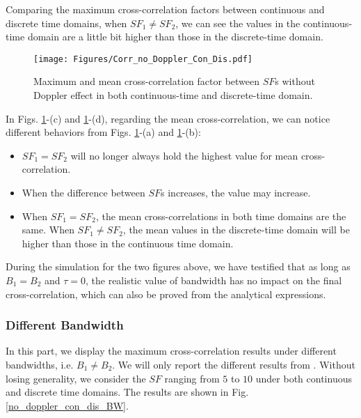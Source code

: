\documentclass{IEEEtaes}
\theoremstyle{plain}
\begin{document}
Comparing the maximum cross-correlation factors between continuous and discrete time domains, when $SF_1 \neq SF_2$, we can see the values in the continuous-time domain are a little bit higher than those in the discrete-time domain.
\begin{figure}[ht]
  \centering
  \texttt{[image: Figures/Corr\_no\_Doppler\_Con\_Dis.pdf]}
  \caption{Maximum and mean cross-correlation factor between $SF$s without Doppler effect in both continuous-time and discrete-time domain.}
  \label{Corr_no_Doppler_Con_Dis}
\end{figure}
In Figs. \ref{Corr_no_Doppler_Con_Dis}-(c) and \ref{Corr_no_Doppler_Con_Dis}-(d), regarding the mean cross-correlation, we can notice different behaviors from Figs. \ref{Corr_no_Doppler_Con_Dis}-(a) and \ref{Corr_no_Doppler_Con_Dis}-(b):
\begin{itemize}
    \item $SF_1 = SF_2$ will no longer always hold the highest value for mean cross-correlation.
    \item When the difference between $SF$s increases, the value may increase. 
    \item When $SF_1 = SF_2$, the mean cross-correlations in both time domains are the same. When $SF_1 \neq SF_2$, the mean values in the discrete-time domain will be higher than those in the continuous time domain.
\end{itemize}

During the simulation for the two figures above, we have testified that as long as $B_1 = B_2$ and $\tau=0$, the realistic value of bandwidth has no impact on the final cross-correlation, which can also be proved from the analytical expressions.

\subsubsection{Different Bandwidth} %
In this part, we display the maximum cross-correlation results under different bandwidths, i.e. $B_1 \neq B_2$. We will only report the different results from \cite{benkhelifa2022orthogonal}.
Without losing generality, we consider the $SF$ ranging from $5$ to $10$ under both continuous and discrete time domains. The results are shown in Fig. \ref{no_doppler_con_dis_BW}.
\end{document}
